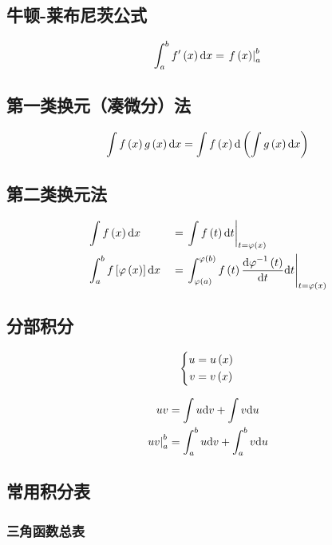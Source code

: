 \documentclass{article}
\begin{document}
\subsection{牛顿-莱布尼茨公式}

\[\int_a^b{f^\prime\left(x\right)\mathrm d x}=\left.f\left(x\right)\right|_a^b\]

\subsection{第一类换元（凑微分）法}

\[\int f\left(x\right)g\left(x\right)\mathrm d x=\int f\left(x\right)\mathrm d\left(\int g\left(x\right)\mathrm d x\right)\]

\subsection{第二类换元法}

\[\begin{aligned}
         & \int f\left(x\right)\mathrm d x                        &  & =\left.\int f\left(t\right)\mathrm d t\right|_{t=\varphi\left(x\right)}                                                                   \\
         & \int_a^bf\left[\varphi\left(x\right)\right]\mathrm d x &  & =\left.\int_{\varphi\left(a\right)}^{\varphi\left(b\right)}{f\left(t\right)\frac{{\mathrm d\varphi}^{-1}\left(t\right)}{ \mathrm d t}\mathrm d t}\right|_{t=\varphi\left(x\right)}
    \end{aligned}\]

\subsection{分部积分}

\[\left\{\begin{aligned}
        u & =u\left(x\right) \\
        v & =v\left(x\right)
    \end{aligned}\right.\]

\[\begin{aligned}
        uv                  & =\int{u\mathrm dv}+\int{v\mathrm du}         \\
        \left.uv\right|_a^b & =\int_a^b{u\mathrm d v}+\int_a^b{v\mathrm d u}
    \end{aligned}\]

\subsection{常用积分表}

\subsubsection{三角函数总表}
\end{document}
